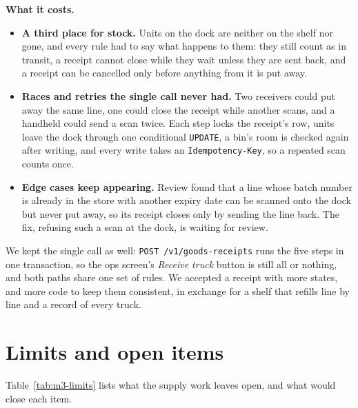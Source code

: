 \textbf{What it costs.}
\begin{itemize}
  \item \textbf{A third place for stock.} Units on the dock are neither on the shelf nor gone, and every rule had to say
    what happens to them: they still count as in transit, a receipt cannot close while they wait unless they are sent
    back, and a receipt can be cancelled only before anything from it is put away.
  \item \textbf{Races and retries the single call never had.} Two receivers could put away the same line, one could
    close the receipt while another scans, and a handheld could send a scan twice. Each step locks the receipt's row,
    units leave the dock through one conditional \texttt{UPDATE}, a bin's room is checked again after writing, and
    every write takes an \texttt{Idempotency-Key}, so a repeated scan counts once.
  \item \textbf{Edge cases keep appearing.} Review found that a line whose batch number is already in the store with
    another expiry date can be scanned onto the dock but never put away, so its receipt closes only by sending the line
    back. The fix, refusing such a scan at the dock, is waiting for review.
\end{itemize}

We kept the single call as well: \texttt{POST /v1/goods-receipts} runs the five steps in one transaction, so the ops
screen's \emph{Receive truck} button is still all or nothing, and both paths share one set of rules. We accepted a receipt with more states, and more
code to keep them consistent, in exchange for a shelf that refills line by line and a record of every truck.

\section{Limits and open items}

Table~\ref{tab:m3-limits} lists what the supply work leaves open, and what would close each item.

